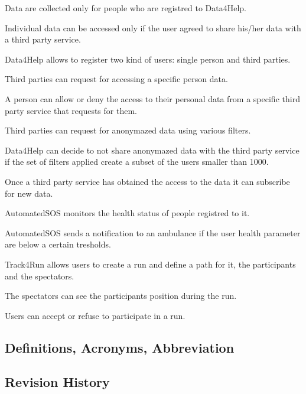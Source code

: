 \documentclass[a4paper]{article}
\begin{document}
\begin{enumerate}[label={[G.\arabic*]}]
	
	
	\item Data are collected only for people who are registred to Data4Help.
	\item Individual data can be accessed only if the user agreed to share his/her data with a third party service.
	\item Data4Help allows to register two kind of users: single person and third parties.
	\item Third parties can request for accessing a specific person data.
	\item A person can allow or deny the access to their personal data from a specific third party service that requests for them.
	\item Third parties can request for anonymazed data using various filters.
	\item Data4Help can decide to not share anonymazed data with the third party service if the set of filters applied create a subset of the users smaller than 1000.
	\item Once a third party service has obtained the access to the data it can subscribe for new data.
	
	\item AutomatedSOS monitors the health status of people registred to it.
	\item AutomatedSOS sends a notification to an ambulance if the user health parameter are below a certain tresholds. 
	
	\item Track4Run allows users to create a run and define a path for it, the participants and the spectators.
	\item The spectators can see the participants position during the run.
	\item Users can accept or refuse to participate in a run.
	
\end{enumerate}

\subsection{Definitions, Acronyms, Abbreviation}

\subsection{Revision History}
\end{document}
